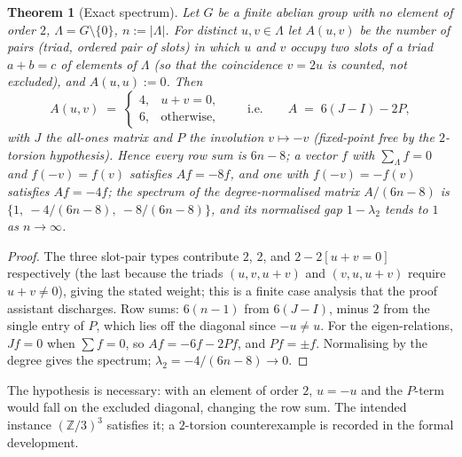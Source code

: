 \documentclass[11pt]{amsart}
\newcommand{\Z}{\mathbb{Z}}
\theoremstyle{plain}
\newtheorem{theorem}{Theorem}[section]
\theoremstyle{definition}
\theoremstyle{remark}
\begin{document}
\begin{theorem}[Exact spectrum]
\label{thm:torus}
Let $G$ be a finite abelian group with no element of order $2$, $\Lambda = G \setminus \{0\}$,
$n := |\Lambda|$. For distinct $u, v \in \Lambda$ let $A(u,v)$ be the number of pairs (triad, ordered
pair of slots) in which $u$ and $v$ occupy two slots of a triad $a + b = c$ of elements of $\Lambda$
(so that the coincidence $v = 2u$ is counted, not excluded), and $A(u,u) := 0$. Then
\[
  A(u,v) \;=\; \begin{cases} 4, & u + v = 0,\\ 6, & \text{otherwise,}\end{cases}
  \qquad\text{i.e.}\qquad A \;=\; 6(J - I) - 2P,
\]
with $J$ the all-ones matrix and $P$ the involution $v \mapsto -v$ (fixed-point free by the
$2$-torsion hypothesis). Hence every row sum is $6n - 8$; a vector $f$ with $\sum_\Lambda f = 0$ and
$f(-v) = f(v)$ satisfies $Af = -8f$, and one with $f(-v) = -f(v)$ satisfies $Af = -4f$; the
spectrum of the degree-normalised matrix $A/(6n-8)$ is $\{1,\ -4/(6n-8),\ -8/(6n-8)\}$, and its
normalised gap $1 - \lambda_2$ tends to $1$ as $n \to \infty$.
\end{theorem}

\begin{proof}
The three slot-pair types contribute $2$, $2$, and $2 - 2[u + v = 0]$ respectively (the last
because the triads $(u, v, u+v)$ and $(v, u, u+v)$ require $u + v \ne 0$), giving the stated
weight; this is a finite case analysis that the proof assistant discharges. Row sums: $6(n-1)$
from $6(J-I)$, minus $2$ from the single entry of $P$, which lies off the diagonal since
$-u \ne u$. For the eigen-relations, $Jf = 0$ when $\sum f = 0$, so $Af = -6f - 2Pf$, and
$Pf = \pm f$. Normalising by the degree gives the spectrum; $\lambda_2 = -4/(6n-8) \to 0$.
\end{proof}

The hypothesis is necessary: with an element of order $2$, $u = -u$ and the $P$-term would fall on
the excluded diagonal, changing the row sum. The intended instance $(\Z/3)^3$ satisfies it; a
$2$-torsion counterexample is recorded in the formal development.
\end{document}
